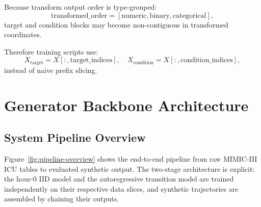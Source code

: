 Because transform output order is type-grouped:
\begin{equation}
\text{transformed\_order} = [\text{numeric},\text{binary},\text{categorical}],
\end{equation}
target and condition blocks may become non-contiguous in transformed coordinates.

Therefore training scripts use:
\begin{equation}
X_{\text{target}} = X[:, \text{target\_indices}], \quad
X_{\text{condition}} = X[:, \text{condition\_indices}],
\end{equation}
instead of naive prefix slicing.

\section{Generator Backbone Architecture}

\subsection{System Pipeline Overview}

Figure~\ref{fig:pipeline-overview} shows the end-to-end pipeline from raw MIMIC-III ICU tables to evaluated synthetic output. The two-stage architecture is explicit: the hour-0 IID model and the autoregressive transition model are trained independently on their respective data slices, and synthetic trajectories are assembled by chaining their outputs.

